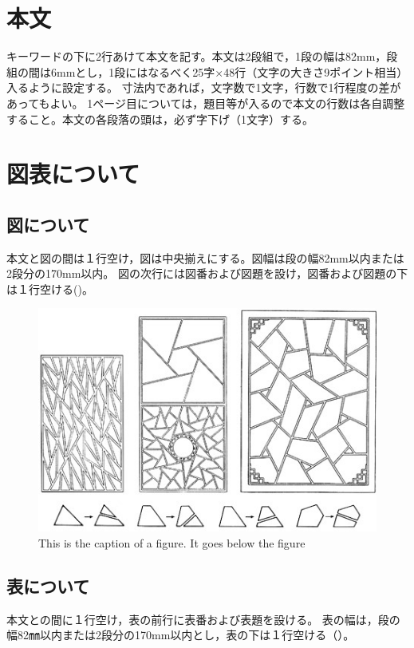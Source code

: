 \documentclass[base=10pt,magstyle=real,a4paper,twocolumn,xelatex,pandoc,jafont=ms]{bxjsarticle}%
\begin{document}
\section{本文}
キーワードの下に2行あけて本文を記す。本文は2段組で，1段の幅は82mm，段組の間は6mmとし，1段にはなるべく25字×48行（文字の大きさ9ポイント相当）入るように設定する。
寸法内であれば，文字数で1文字，行数で1行程度の差があってもよい。
1ページ目については，題目等が入るので本文の行数は各自調整すること。本文の各段落の頭は，必ず字下げ（1文字）する。


\section{図表について}
\subsection{図について}
本文と図の間は１行空け，図は中央揃えにする。図幅は段の幅82mm以内または2段分の170mm以内。
図の次行には図番および図題を設け，図番および図題の下は１行空ける()。
\begin{figure}[H]
	\centering
	\includegraphics[width=1\linewidth]{../figure/figure_sympo.jpg}
	\caption{This is the caption of a figure. It goes below the figure}
	\label{fig:figuresympo}
\end{figure}

\subsection{表について}
本文との間に１行空け，表の前行に表番および表題を設ける。
表の幅は，段の幅82㎜以内または2段分の170mm以内とし，表の下は１行空ける（）。
\end{document}
